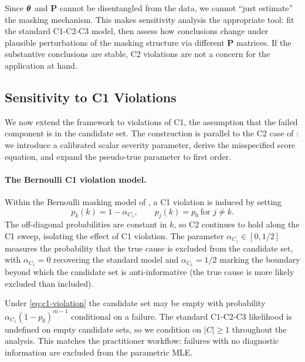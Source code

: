 \begin{remark}[Implications]
Since $\bm{\theta}$ and $\mathbf{P}$ cannot be disentangled from the data, we
cannot ``just estimate'' the masking mechanism. This makes sensitivity
analysis the appropriate tool: fit the standard C1-C2-C3 model, then assess
how conclusions change under plausible perturbations of the masking structure
via different $\mathbf{P}$ matrices. If the substantive conclusions are stable,
C2 violations are not a concern for the application at hand.
\end{remark}

\subsection{Sensitivity to C1 Violations}
\label{sec:c1-sensitivity}

We now extend the framework to violations of C1, the assumption that the
failed component is in the candidate set. The construction is parallel to
the C2 case of : we introduce a calibrated
scalar severity parameter, derive the misspecified score equation, and
expand the pseudo-true parameter to first order.

\paragraph{The Bernoulli C1 violation model.}
Within the Bernoulli masking model of , a C1 violation
is induced by setting
\begin{equation}
\label{eq:c1-violation}
    p_k(k) = 1 - \alpha_{C_1}, \qquad
    p_j(k) = p_0 \ \text{for } j \neq k.
\end{equation}
The off-diagonal probabilities are constant in $k$, so C2 continues to
hold along the C1 sweep, isolating the effect of C1 violation. The
parameter $\alpha_{C_1} \in [0, 1/2]$ measures the probability that the
true cause is excluded from the candidate set, with $\alpha_{C_1} = 0$
recovering the standard model and $\alpha_{C_1} = 1/2$ marking the boundary
beyond which the candidate set is anti-informative (the true cause is
more likely excluded than included).

Under \eqref{eq:c1-violation} the candidate set may be empty with
probability $\alpha_{C_1} (1 - p_0)^{m-1}$ conditional on a failure. The
standard C1-C2-C3 likelihood is undefined on empty candidate sets, so we
condition on $|C| \geq 1$ throughout the analysis. This matches the
practitioner workflow: failures with no diagnostic information are
excluded from the parametric MLE.

